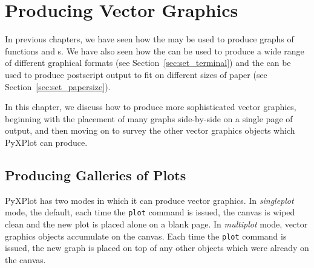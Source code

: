 %
%
%
%
%



\chapter{Producing Vector Graphics}
\label{ch:vector_graphics}

In previous chapters, we have seen how the  may be used to
produce graphs of functions and \datafile s. We have also seen how the
 can be used to produce a wide range of different
graphical formats (see Section~\ref{sec:set_terminal}) and the  can be used to produce postscript output to fit on different sizes
of paper (see Section~\ref{sec:set_papersize}).

In this chapter, we discuss how to produce more sophisticated vector graphics,
beginning with the placement of many graphs side-by-side on a single page of
output, and then moving on to survey the other vector graphics objects which
PyXPlot can produce.

\section{Producing Galleries of Plots}
\label{sec:multiplot}

PyXPlot has two modes in which it can produce vector graphics. In {\it
singleplot} mode, the default, each time the {\tt plot} command is issued, the
canvas is wiped clean and the new plot is placed alone on a blank page. In {\it
multiplot} mode, vector graphics objects accumulate on the canvas. Each time
the {\tt plot} command is issued, the new graph is placed on top of any other
objects which were already on the canvas.

